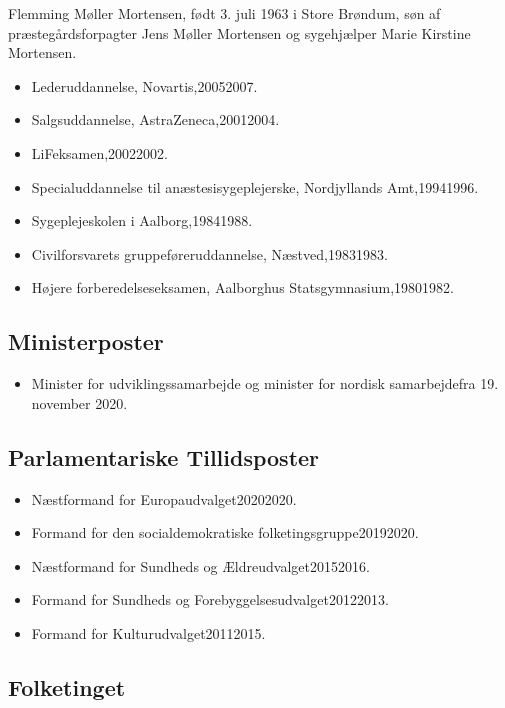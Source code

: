 \documentclass[11pt, a4paper]{awesome-cv}
\begin{document}
\makecvheader[R]
\makelettertitle
\begin{cvletter}
Flemming Møller Mortensen, født 3. juli 1963 i Store Brøndum, søn af præstegårdsforpagter Jens Møller Mortensen og sygehjælper Marie Kirstine Mortensen.

\begin{itemize}
\item Lederuddannelse, Novartis,20052007.
\item Salgsuddannelse, AstraZeneca,20012004.
\item LiFeksamen,20022002.
\item Specialuddannelse til anæstesisygeplejerske, Nordjyllands Amt,19941996.
\item Sygeplejeskolen i Aalborg,19841988.
\item Civilforsvarets gruppeføreruddannelse, Næstved,19831983.
\item Højere forberedelseseksamen, Aalborghus Statsgymnasium,19801982.
\end{itemize}
\subsection*{Ministerposter}
\begin{itemize}
\item Minister for udviklingssamarbejde og minister for nordisk samarbejdefra 19. november 2020.
\end{itemize}
\subsection*{Parlamentariske Tillidsposter}
\begin{itemize}
\item Næstformand for Europaudvalget20202020.
\item Formand for den socialdemokratiske folketingsgruppe20192020.
\item Næstformand for Sundheds og Ældreudvalget20152016.
\item Formand for Sundheds og Forebyggelsesudvalget20122013.
\item Formand for Kulturudvalget20112015.
\end{itemize}
\subsection*{Folketinget}

\end{cvletter}
\end{document}
